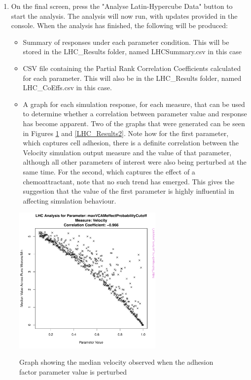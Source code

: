\documentclass[a4paper,11pt]{article}
\begin{document}
\begin{enumerate}
\item On the final screen, press the "Analyse Latin-Hypercube Data" button to start the analysis. The analysis will now run, with updates provided in the console. When the analysis has finished, the following will be produced:
\begin{itemize}
\item Summary of responses under each parameter condition. This will be stored in the LHC\_Results folder, named LHCSummary.csv in this case
\item CSV file containing the Partial Rank Correlation Coefficients calculated for each parameter. This will also be in the LHC\_Results folder, named LHC\_CoEffs.csv in this case.
\item A graph for each simulation response, for each measure, that can be used to determine whether a correlation between parameter value and response has become apparent. Two of the graphs that were generated can be seen in Figures \ref{LHC_Results1} and \ref{LHC_Results2}. Note how for the first parameter, which captures cell adhesion, there is a definite correlation between the Velocity simulation output measure and the value of that parameter, although all other parameters of interest were also being perturbed at the same time.  For the second, which captures the effect of a chemoattractant, note that no such trend has emerged. This gives the suggestion that the value of the first parameter is highly influential in affecting simulation behaviour.
\end{itemize}

\end{enumerate}
\newpage 
\begin{figure}[h!]
\centering
    \includegraphics[width=0.65\textwidth]{LHC_maxVCAMeffectProbabilityCutoff_Velocity.pdf}\\ \noindent
    \caption{Graph showing the median velocity observed when the adhesion factor parameter value is perturbed}
    \label{LHC_Results1}
    \end{figure}
\end{document}
